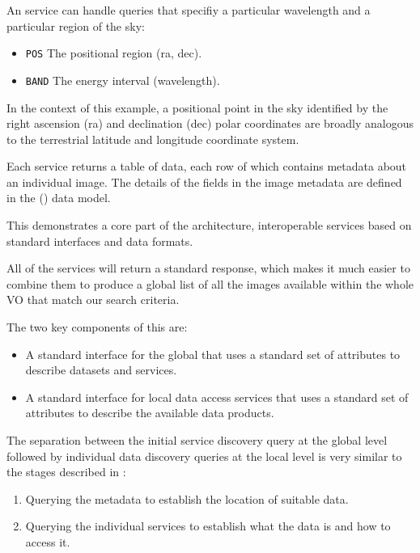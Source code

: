 \documentclass{article}
\begin{document}
\noindent
An \cite{ivoa-sia} service can handle queries that specifiy a particular
wavelength and a particular region of the sky:
\begin{itemize}
  \item \texttt{POS}  The positional region (ra, dec).
  \item \texttt{BAND} The energy interval (wavelength).
\end{itemize}

In the context of this example, a positional point in the sky identified
by the right ascension (ra) and declination (dec) polar coordinates are
broadly analogous to the terrestrial latitude and longitude coordinate system.

Each \cite{ivoa-sia} service returns a table of data, each row of which
contains metadata about an individual image. The details of the fields
in the image metadata are defined in the 
(\cite{ivoa-obscore}) data model.

This demonstrates a core part of the \cite{ivoa} architecture, interoperable
services based on standard interfaces and data formats.

All of the \cite{ivoa-sia} services will return a standard response, which
makes it much easier to combine them to produce a global list of all the
images available within the whole VO that match our search criteria.

\noindent
The two key components of this are:
\begin{itemize}
    \item A standard interface for the global \cite{ivoa-reg} that uses a
    standard set of attributes to describe datasets and services.
    \item A standard interface for local \cite{ivoa-sia} data access services
    that uses a standard set of attributes to describe the available data
    products.
\end{itemize}

The separation between the initial service discovery query at the global
level followed by individual data discovery queries at the local level is
very similar to the stages described in \cite{jones-2006}:
\begin{enumerate}
  \item Querying the metadata to establish the location of suitable data.
  \item Querying the individual services to establish what the data is and
  how to access it.
\end{enumerate}
\end{document}
